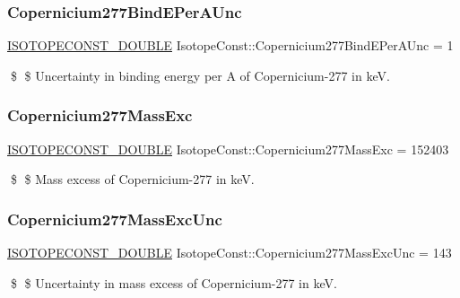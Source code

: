 \subsubsection{\texorpdfstring{Copernicium277\+Bind\+E\+Per\+A\+Unc}{Copernicium277BindEPerAUnc}}
{\footnotesize\ttfamily \mbox{\hyperlink{group___isotope_const-_macros_ga8f45a7272ce02c0b4c65c44636ed719a}{I\+S\+O\+T\+O\+P\+E\+C\+O\+N\+S\+T\+\_\+\+D\+O\+U\+B\+LE}} Isotope\+Const\+::\+Copernicium277\+Bind\+E\+Per\+A\+Unc = 1}

\$ \$ Uncertainty in binding energy per A of Copernicium-\/277 in keV. \mbox{\label{group___isotope_const-_copernicium-_cn277_ga09ff8c3bdb78ed6cf1a41d7ce33765f2}} 
\subsubsection{\texorpdfstring{Copernicium277\+Mass\+Exc}{Copernicium277MassExc}}
{\footnotesize\ttfamily \mbox{\hyperlink{group___isotope_const-_macros_ga8f45a7272ce02c0b4c65c44636ed719a}{I\+S\+O\+T\+O\+P\+E\+C\+O\+N\+S\+T\+\_\+\+D\+O\+U\+B\+LE}} Isotope\+Const\+::\+Copernicium277\+Mass\+Exc = 152403}

\$ \$ Mass excess of Copernicium-\/277 in keV. \mbox{\label{group___isotope_const-_copernicium-_cn277_gaf58f58a8449fa6f025bcb6f738588bef}} 
\subsubsection{\texorpdfstring{Copernicium277\+Mass\+Exc\+Unc}{Copernicium277MassExcUnc}}
{\footnotesize\ttfamily \mbox{\hyperlink{group___isotope_const-_macros_ga8f45a7272ce02c0b4c65c44636ed719a}{I\+S\+O\+T\+O\+P\+E\+C\+O\+N\+S\+T\+\_\+\+D\+O\+U\+B\+LE}} Isotope\+Const\+::\+Copernicium277\+Mass\+Exc\+Unc = 143}

\$ \$ Uncertainty in mass excess of Copernicium-\/277 in keV. \mbox{\label{group___isotope_const-_copernicium-_cn277_gad6408d4ceb0a6fcd46b7c554ab2ee71e}} 
